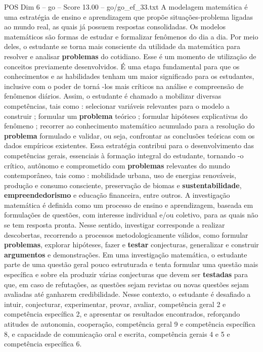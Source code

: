 \begin{textsample}{POS Dim 6 – go – Score 13.00 – go/go\_ef\_33.txt}
A modelagem matemática é uma estratégia de ensino e aprendizagem que propõe situações-problema ligadas ao mundo real, as quais já possuem respostas consolidadas.
Os modelos matemáticos são formas de estudar e formalizar fenômenos do dia a dia.
Por meio deles, o estudante se torna mais consciente da utilidade da matemática para resolver e analisar \textbf{problemas} do cotidiano.
Esse é um momento de utilização de conceitos previamente desenvolvidos.
É uma etapa fundamental para que os conhecimentos e as habilidades tenham um maior significado para os estudantes, inclusive com o poder de torná -los mais críticos na análise e compreensão de fenômenos diários.
Assim, o estudante é chamado a mobilizar diversas competências, tais como : selecionar variáveis relevantes para o modelo a construir ; formular um \textbf{problema} teórico ; formular hipóteses explicativas do fenômeno ; recorrer ao conhecimento matemático acumulado para a resolução do \textbf{problema} formulado e validar, ou seja, confrontar as conclusões teóricas com os dados empíricos existentes.
Essa estratégia contribui para o desenvolvimento das competências gerais, essenciais à formação integral do estudante, tornando -o crítico, autônomo e comprometido com \textbf{problemas} relevantes do mundo contemporâneo, tais como : mobilidade urbana, uso de energias renováveis, produção e consumo consciente, preservação de biomas e \textbf{sustentabilidade}, \textbf{empreendedorismo} e educação financeira, entre outros.
A investigação matemática é definida como um processo de ensino e aprendizagem, baseada em formulações de questões, com interesse individual e/ou coletivo, para as quais não se tem resposta pronta.
Nesse sentido, investigar corresponde a realizar descobertas, recorrendo a processos metodologicamente válidos, como formular \textbf{problemas}, explorar hipóteses, fazer e \textbf{testar} conjecturas, generalizar e construir \textbf{argumentos} e demonstrações.
Em uma investigação matemática, o estudante parte de uma questão geral pouco estruturada e tenta formular uma questão mais específica e sobre ela produzir várias conjecturas que devem ser \textbf{testadas} para que, em caso de refutações, as questões sejam revistas ou novas questões sejam avaliadas até ganharem credibilidade.
Nesse contexto, o estudante é desafiado a intuir, conjecturar, experimentar, provar, avaliar, competência geral 2 e competência específica 2, e apresentar os resultados encontrados, reforçando atitudes de autonomia, cooperação, competência geral 9 e competência específica 8, e capacidade de comunicação oral e escrita, competência gerais 4 e 5 e competência específica 6.

\end{textsample}
